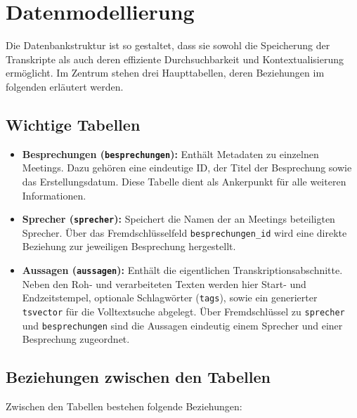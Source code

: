 \section{Datenmodellierung}

Die Datenbankstruktur ist so gestaltet, dass sie sowohl die Speicherung der
Transkripte als auch deren effiziente Durchsuchbarkeit und Kontextualisierung ermöglicht.
Im Zentrum stehen drei Haupttabellen, deren Beziehungen im folgenden erläutert werden.

\subsection{Wichtige Tabellen}
\label{sec:datenmodell:tabellen}

\begin{itemize}
    \item \textbf{Besprechungen (\texttt{besprechungen}):}
    Enthält Metadaten zu einzelnen Meetings. Dazu gehören eine eindeutige ID, der Titel der Besprechung sowie das Erstellungsdatum.
    Diese Tabelle dient als Ankerpunkt für alle weiteren Informationen.

    \item \textbf{Sprecher (\texttt{sprecher}):}
    Speichert die Namen der an Meetings beteiligten Sprecher.
    Über das Fremdschlüsselfeld \texttt{besprechungen\_id} wird eine direkte Beziehung zur jeweiligen Besprechung hergestellt.

    \item \textbf{Aussagen (\texttt{aussagen}):}
    Enthält die eigentlichen Transkriptionsabschnitte. Neben den Roh- und verarbeiteten Texten
    werden hier Start- und Endzeitstempel, optionale Schlagwörter (\texttt{tags}),
    sowie ein generierter \texttt{tsvector} für die Volltextsuche abgelegt.
    Über Fremdschlüssel zu \texttt{sprecher} und \texttt{besprechungen}
    sind die Aussagen eindeutig einem Sprecher und einer Besprechung zugeordnet.
\end{itemize}

\subsection{Beziehungen zwischen den Tabellen}
\label{sec:datenmodell:relationen}

Zwischen den Tabellen bestehen folgende Beziehungen:

